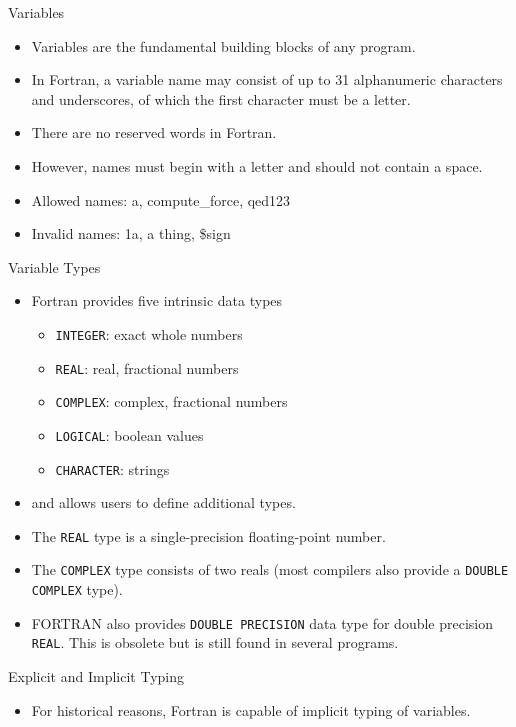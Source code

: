 \documentclass[c,mathserif,compress,xcolor=svgnames]{beamer}
\newcommand{\lstfortran}[1]{\lstinline[language={[90]Fortran},basicstyle=\footnotesize\ttfamily]|#1|}
\newenvironment{eblock}[0]
{
\begin{beamerboxesrounded}[upper=uppercol2,lower=lowercol2,shadow=true]}
{\end{beamerboxesrounded}}
\begin{document}
\begin{frame}[allowframebreaks]{Variables}
  \begin{itemize}
    \item Variables are the fundamental building blocks of any program.
    \item In Fortran, a variable name may consist of up to 31 alphanumeric characters and underscores, of which the first character must be a letter.
    \item There are no reserved words in Fortran.
    \item However, names must begin with a letter and should not contain a space.
    \item Allowed names: a, compute\_force, qed123
    \item Invalid names: 1a, a thing, \$sign
  \end{itemize}
  \begin{eblock}{Variable Types}
    \begin{itemize}
      \item Fortran provides five intrinsic data types
      \begin{itemize}
        \item[] \lstfortran{INTEGER}: exact whole numbers
        \item[] \lstfortran{REAL}: real, fractional numbers
        \item[] \lstfortran{COMPLEX}: complex, fractional numbers
        \item[] \lstfortran{LOGICAL}: boolean values
        \item[] \lstfortran{CHARACTER}: strings
      \end{itemize}
      \item and allows users to define additional types.
      \item The \lstfortran{REAL} type is a single-precision floating-point number.
      \item The \lstfortran{COMPLEX} type consists of two reals (most compilers also provide a \lstfortran{DOUBLE COMPLEX} type).
      \item FORTRAN also provides \lstfortran{DOUBLE PRECISION} data type for double precision \lstfortran{REAL}. This is obsolete but is still found in several programs.
    \end{itemize}
  \end{eblock}
  \begin{eblock}{Explicit and Implicit Typing}
    \begin{itemize}
      \item For historical reasons, Fortran is capable of implicit typing of variables.

\end{itemize}
\end{eblock}
\end{frame}
\end{document}
